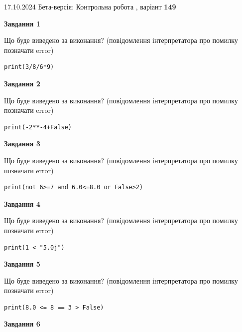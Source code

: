 \documentclass[12pt, ukrainian]{article}
\begin{document}
{\Large{17.10.2024 Бета-версія: Контрольна робота , варіант  \No \textbf { 149 }\par}}
{
\begin {large}
{\begin {center}\textbf{Завдання 1}\end {center}}

Що буде виведено за виконання? (повідомлення інтерпретатора про помилку позначати error)\par
\begin{verbatim}
print(3/8/6*9)
\end{verbatim}

{\begin {center}\textbf{Завдання 2}\end {center}}

Що буде виведено за виконання? (повідомлення інтерпретатора про помилку позначати error)\par
\begin{verbatim}
print(-2**-4+False)
\end{verbatim}

{\begin {center}\textbf{Завдання 3}\end {center}}

Що буде виведено за виконання? (повідомлення інтерпретатора про помилку позначати error)\par
\begin{verbatim}
print(not 6>=7 and 6.0<=8.0 or False>2)
\end{verbatim}

{\begin {center}\textbf{Завдання 4}\end {center}}

Що буде виведено за виконання? (повідомлення інтерпретатора про помилку позначати error)\par
\begin{verbatim}
print(1 < "5.0j")
\end{verbatim}

{\begin {center}\textbf{Завдання 5}\end {center}}

Що буде виведено за виконання? (повідомлення інтерпретатора про помилку позначати error)\par
\begin{verbatim}
print(8.0 <= 8 == 3 > False)
\end{verbatim}

{\begin {center}\textbf{Завдання 6}\end {center}}


\end{large}}
\end{document}
